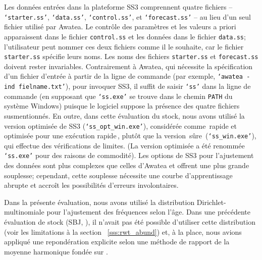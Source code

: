 \documentclass[11pt]{book}
\newcommand{\angL}{\guillemotleft\,}
\newcommand{\angR}{\,\guillemotright}
\newcommand{\code}[1]{\normalsize\texttt{#1}\normalsize}%
\begin{document}
Les donn\'{e}es entr\'{e}es dans la plateforme SS3 comprennent quatre fichiers -- \code{`starter.ss'}, \code{`data.ss'}, \code{`control.ss'}, et \code{`forecast.ss'} -- au lieu d'un seul fichier utilis\'{e} par Awatea. Le contr\^{o}le des param\`{e}tres et les valeurs a priori apparaissent dans le fichier \code{control.ss} et les donn\'{e}es dans le fichier \code{data.ss}; l'utilisateur peut nommer ces deux fichiers comme il le souhaite, car le fichier \code{starter.ss} sp\'{e}cifie leurs noms.
Les noms des fichiers \code{starter.ss} et \code{forecast.ss} doivent rester invariables.
Contrairement \`{a} Awatea, qui n\'{e}cessite la sp\'{e}cification d'un fichier d'entr\'{e}e \`{a} partir de la ligne de commande (par exemple, \code{`awatea -ind fielname.txt'}), pour invoquer SS3, il suffit de saisir \code{`ss'} dans la ligne de commande (en supposant que \code{`ss.exe'} se trouve dans le chemin \code{PATH} du syst\`{e}me Windows) puisque le logiciel suppose la pr\'{e}sence des quatre fichiers susmentionn\'{e}s. En outre, dans cette \'{e}valuation du stock, nous avons utilis\'{e} la version optimis\'{e}e de SS3 (\code{`ss\_opt\_win.exe'}), consid\'{e}r\'{e}e comme \angL{}rapide et optimis\'{e}e pour une ex\'{e}cution rapide\angR{}, plut\^{o}t que la version \angL{}s\^{u}re\angR{} (\code{`ss\_win.exe'}), qui effectue des v\'{e}rifications de limites.
(La version optimis\'{e}e a \'{e}t\'{e} renomm\'{e}e \code{`ss.exe'} pour des raisons de commodit\'{e}).
Les options de SS3 pour l'ajustement des donn\'{e}es sont plus complexes que celles d'Awatea et offrent une plus grande souplesse; cependant, cette souplesse n\'{e}cessite une courbe d'apprentissage abrupte et accro\^{i}t les possibilit\'{e}s d'erreurs involontaires.

Dans la pr\'{e}sente \'{e}valuation, nous avons utilis\'{e} la distribution Dirichlet-multinomiale pour l'ajustement des fr\'{e}quences selon l'\^{a}ge. Dans une pr\'{e}c\'{e}dente \'{e}valuation de stock (SBJ, \citealt{DFO-SAR:2022_ymr}), il n'avait pas \'{e}t\'{e} possible d'utiliser cette distribution (voir les limitations \`{a} la section ~\ref{sss:rwt_abund}) et, \`{a} la place, nous avions appliqu\'{e} une repond\'{e}ration explicite selon une m\'{e}thode de rapport de la moyenne harmonique fond\'{e}e sur \citet{McAllister-Ianelli:1997}.
\end{document}
